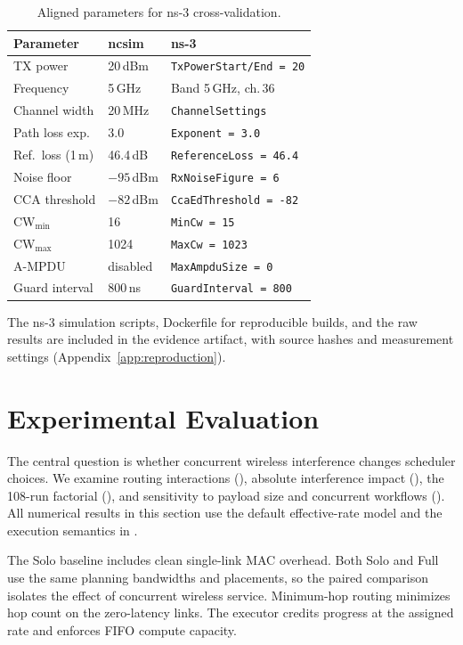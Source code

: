 \documentclass[conference]{IEEEtran}
\begin{document}
\begin{table}[t]
\centering
\caption{Aligned parameters for ns-3 cross-validation.}
\label{tab:ns3_params}
\begin{tabular}{@{}lll@{}}
\toprule
\textbf{Parameter} & \textbf{ncsim} & \textbf{ns-3} \\
\midrule
TX power & 20\,dBm & \texttt{TxPowerStart/End = 20} \\
Frequency & 5\,GHz & Band 5\,GHz, ch.\,36 \\
Channel width & 20\,MHz & \texttt{ChannelSettings} \\
Path loss exp. & 3.0 & \texttt{Exponent = 3.0} \\
Ref.\ loss (1\,m) & 46.4\,dB & \texttt{ReferenceLoss = 46.4} \\
Noise floor & $-95$\,dBm & \texttt{RxNoiseFigure = 6} \\
CCA threshold & $-82$\,dBm & \texttt{CcaEdThreshold = -82} \\
CW$_{\min}$ & 16 & \texttt{MinCw = 15} \\
CW$_{\max}$ & 1024 & \texttt{MaxCw = 1023} \\
A-MPDU & disabled & \texttt{MaxAmpduSize = 0} \\
Guard interval & 800\,ns & \texttt{GuardInterval = 800} \\
\bottomrule
\end{tabular}
\end{table}

The ns-3 simulation scripts, Dockerfile for reproducible builds, and the
raw results are included in the evidence artifact, with source hashes
and measurement settings (Appendix~\ref{app:reproduction}).


\section{Experimental Evaluation}
\label{sec:eval}

The central question is whether concurrent wireless interference changes
scheduler choices. We examine
routing interactions (), absolute interference
impact (), the 108-run factorial
(), and sensitivity to payload size and concurrent
workflows (). All numerical results in this section
use the default effective-rate model and the execution semantics in
.

The Solo baseline includes clean single-link MAC overhead. Both Solo
and Full use the same planning bandwidths and placements, so the paired
comparison isolates the effect of concurrent wireless service. Minimum-hop
routing minimizes hop count on the zero-latency links. The executor credits
progress at the assigned rate and enforces FIFO compute capacity.
\end{document}
